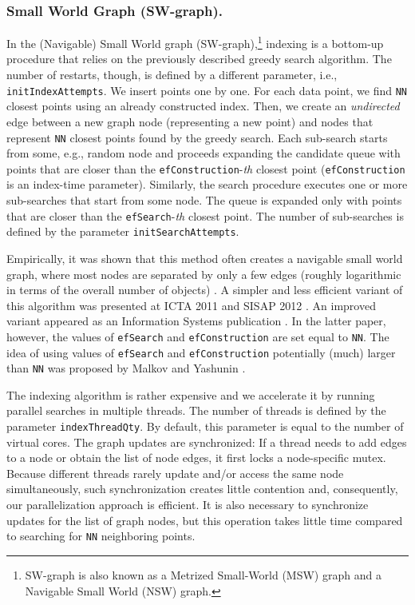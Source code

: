 \documentclass[runningheads,a4paper]{llncs}
\newcommand{\ttt}[1]{\texttt{#1}}
\begin{document}
\subsubsection{Small World Graph (SW-graph).} \label{SectionSWGraph}
In the (Navigable) Small World graph (SW-graph),\footnote{SW-graph is also known as a Metrized Small-World (MSW) graph
and a Navigable Small World (NSW) graph.}
indexing is a bottom-up procedure that relies on the previously described greedy search algorithm.  
The number of restarts, though, is defined by a different parameter, i.e., \ttt{initIndexAttempts}.
We insert points one by one. For each data point, 
we find \ttt{NN} closest points using an already constructed index.
Then, we create an \emph{undirected} edge between a new graph node (representing a new point) 
and nodes that represent \ttt{NN} closest points found by the greedy search. 
Each sub-search starts from some, e.g., random node and proceeds expanding the candidate queue with points that are closer
than the \ttt{efConstruction}-\textit{th} closest point (\ttt{efConstruction} is an index-time parameter).
Similarly, the search procedure executes one or more sub-searches that start from some node.
The queue is expanded only with points that are closer than the \ttt{efSearch}-\textit{th} closest point.
The number of sub-searches is defined by the parameter \ttt{initSearchAttempts}.

Empirically, it was shown that this method often creates a navigable small world graph, where most nodes are separated by only a few edges (roughly logarithmic in terms of the overall number of objects) \cite{malkov2012scalable}.
A simpler and less efficient variant of this algorithm was presented at ICTA 2011 and SISAP 2012 \cite{Ponomarenko2011,malkov2012scalable}.
An improved variant appeared as an Information Systems publication \cite{malkov2014}.
In the latter paper, however, the values of \ttt{efSearch} and \ttt{efConstruction} are set equal to \ttt{NN}.
The idea of using values of \ttt{efSearch} and \ttt{efConstruction} potentially (much) larger than \ttt{NN}
was proposed by Malkov and Yashunin \cite{Malkov2016}.

The indexing algorithm is rather expensive and we accelerate it by running parallel searches in multiple threads. The number of threads is defined by the parameter \ttt{indexThreadQty}. By default, this parameter is equal to the number of virtual cores.
The graph updates are synchronized: If a thread  needs to add edges to a node or obtain
the list of node edges, it first locks a node-specific mutex.
Because different threads rarely update and/or access the same node simultaneously,
such synchronization creates little contention and, consequently,
our parallelization approach is efficient.
It is also necessary to synchronize updates for the list of graph nodes, 
but this operation takes little time compared to searching for \ttt{NN} neighboring points.
\end{document}
